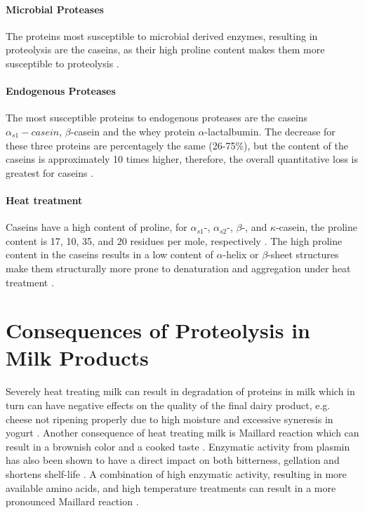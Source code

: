 \paragraph*{Microbial Proteases}
    The proteins most susceptible to microbial derived enzymes, resulting in proteolysis are the caseins, as their high proline content makes them more susceptible to proteolysis \cite*{b03_milk_proteins}.

\paragraph*{Endogenous Proteases}
The most susceptible proteins to endogenous proteases are the caseins $\alpha_{s1}-casein$, $\beta$-casein and the whey protein $\alpha$-lactalbumin. The decrease for these three proteins are percentagely the same (26-75\%), but the content of the caseins is approximately 10 times higher, therefore, the overall quantitative loss is greatest for caseins \cite*{s05_mastitis_complex}.


\paragraph*{Heat treatment}
Caseins have a high content of proline, for $\alpha_{s1}$-, $\alpha_{s2}$-, $\beta$-, and $\kappa$-casein, the proline content is 17, 10, 35, and 20 residues per mole, respectively \cite*{b03_milk_proteins}. The high proline content in the caseins results in a low content of $\alpha$-helix or $\beta$-sheet structures make them structurally more prone to denaturation and aggregation under heat treatment \cite*{b03_milk_proteins}.


\section{Consequences of Proteolysis in Milk Products}
Severely heat treating milk can result in degradation of proteins in milk which in turn can have negative effects on the quality of the final dairy product, e.g. cheese not ripening properly due to high moisture and excessive syneresis in yogurt   \cite*{b02_heat_induced_changes_in_milk}. Another consequence of heat treating milk is Maillard reaction which can result in a brownish color and a cooked taste \cite*{a08_shelf_life_of_heat_treated_dairy_products}. Enzymatic activity from plasmin has also been shown to have a direct impact on both bitterness, gellation and shortens shelf-life \cite*{a08_shelf_life_of_heat_treated_dairy_products}. A combination of high enzymatic activity, resulting in more available amino acids, and high temperature treatments can result in a more pronounced Maillard reaction \cite*{a08_shelf_life_of_heat_treated_dairy_products}.

